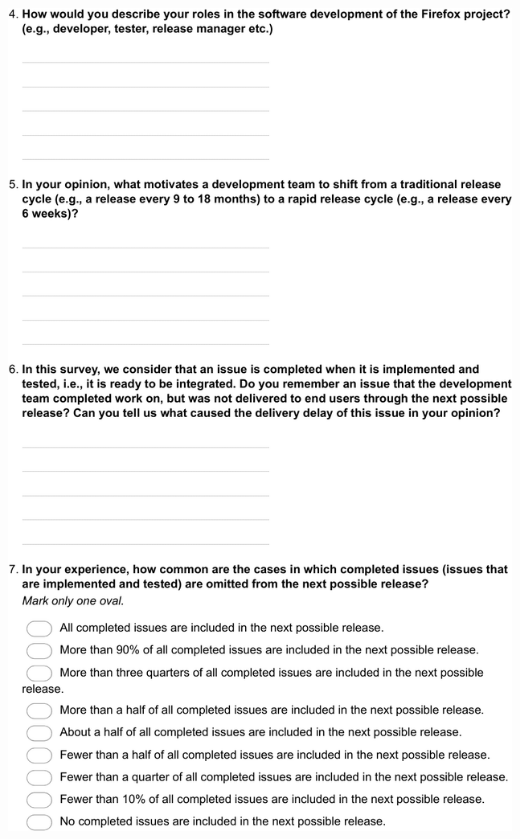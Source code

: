 \documentclass[
	12pt,				%
	openright,			%
	oneside,			%
	a4paper,			%
	french,				%
	spanish,			%
	brazil,				%
	english
	]{abntex2}
\newcounter{pt}
\newcounter{th}
\begin{document}
\begin{apendicesenv}
\includegraphics[width=.8\textwidth,keepaspectratio]{chapters/chapter5/appendix/Firefox2.pdf}


\end{apendicesenv}
\end{document}
